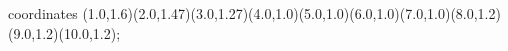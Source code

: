 					coordinates { (1.0,1.6)(2.0,1.47)(3.0,1.27)(4.0,1.0)(5.0,1.0)(6.0,1.0)(7.0,1.0)(8.0,1.2)(9.0,1.2)(10.0,1.2)};